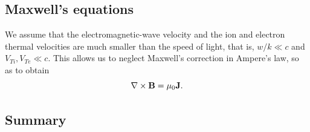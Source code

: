 \documentclass[a4paper,11pt]{report}
\begin{document}
\subsection{Maxwell's equations}

We assume that the electromagnetic-wave velocity and the ion and electron thermal velocities are much smaller than the speed of light, that is, $w/k \ll c$ and $V_{Ti}, V_{Te} \ll c$. This allows us to neglect Maxwell's correction in Ampere's law, so as to obtain
\begin{equation}
    \nabla \times \mathbf{B} = \mu_0 \mathbf{J}.
\end{equation}

\subsection{Summary}
\label{sec:mhd_sf_summary}
\end{document}
